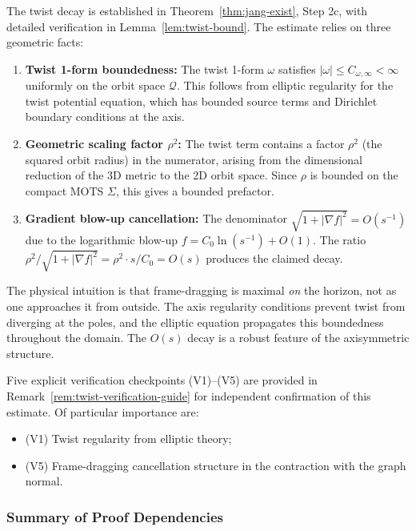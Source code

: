 The twist decay is established in Theorem~\ref{thm:jang-exist}, Step 2c, with detailed verification in Lemma~\ref{lem:twist-bound}. The estimate relies on three geometric facts:

\begin{enumerate}[label=(\roman*)]
\item \textbf{Twist 1-form boundedness:} The twist 1-form $\omega$ satisfies $|\omega| \leq C_{\omega,\infty} < \infty$ uniformly on the orbit space $\mathcal{Q}$. This follows from elliptic regularity for the twist potential equation, which has bounded source terms and Dirichlet boundary conditions at the axis.

\item \textbf{Geometric scaling factor $\rho^2$:} The twist term contains a factor $\rho^2$ (the squared orbit radius) in the numerator, arising from the dimensional reduction of the 3D metric to the 2D orbit space. Since $\rho$ is bounded on the compact MOTS $\Sigma$, this gives a bounded prefactor.

\item \textbf{Gradient blow-up cancellation:} The denominator $\sqrt{1 + |\nabla f|^2} = O(s^{-1})$ due to the logarithmic blow-up $f = C_0 \ln(s^{-1}) + O(1)$. The ratio $\rho^2 / \sqrt{1 + |\nabla f|^2} = \rho^2 \cdot s / C_0 = O(s)$ produces the claimed decay.
\end{enumerate}

The physical intuition is that frame-dragging is maximal \emph{on} the horizon, not as one approaches it from outside. The axis regularity conditions prevent twist from diverging at the poles, and the elliptic equation propagates this boundedness throughout the domain. The $O(s)$ decay is a robust feature of the axisymmetric structure.

Five explicit verification checkpoints (V1)--(V5) are provided in Remark~\ref{rem:twist-verification-guide} for independent confirmation of this estimate. Of particular importance are:
\begin{itemize}
\item (V1) Twist regularity from elliptic theory;
\item (V5) Frame-dragging cancellation structure in the contraction with the graph normal.
\end{itemize}

\subsubsection{Summary of Proof Dependencies}

